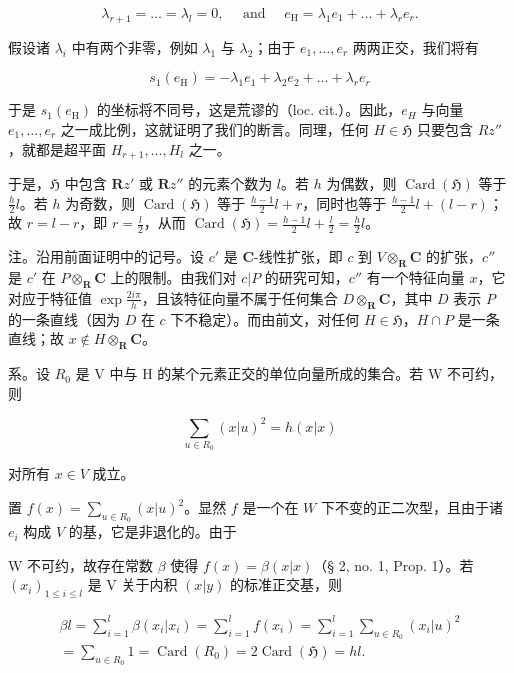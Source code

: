 \[
\lambda_ {r + 1} = \dots = \lambda_ {l} = 0, \quad \text { and } \quad e _ {\mathrm{H}} = \lambda_ {1} e _ {1} + \dots + \lambda_ {r} e _ {r}.
\]

假设诸 \(\lambda_{i}\) 中有两个非零，例如 \(\lambda_{1}\) 与 \(\lambda_{2}\)；由于 \(e_{1},\ldots,e_{r}\) 两两正交，我们将有

\[
s _ {1} (e _ {\mathrm{H}}) = - \lambda_ {1} e _ {1} + \lambda_ {2} e _ {2} + \dots + \lambda_ {r} e _ {r}
\]

于是 \(s_{1}(e_{\mathrm{H}})\) 的坐标将不同号，这是荒谬的（loc. cit.）。因此，\(e_{H}\) 与向量 \(e_{1},\ldots,e_{r}\) 之一成比例，这就证明了我们的断言。同理，任何 \(H\in \mathfrak{H}\) 只要包含 \(Rz''\)，就都是超平面 \(H_{r+1},\ldots,H_{l}\) 之一。

于是，\(\mathfrak{H}\) 中包含 \(\mathbf{R}z'\) 或 \(\mathbf{R}z''\) 的元素个数为 \(l\)。若 \(h\) 为偶数，则 \(\operatorname{Card}(\mathfrak{H})\) 等于 \(\frac{h}{2} l\)。若 \(h\) 为奇数，则 \(\operatorname{Card}(\mathfrak{H})\) 等于 \(\frac{h - 1}{2} l + r\)，同时也等于 \(\frac{h - 1}{2} l + (l - r)\)；故 \(r = l - r\)，即 \(r = \frac{l}{2}\)，从而 \(\operatorname{Card}(\mathfrak{H}) = \frac{h - 1}{2} l + \frac{l}{2} = \frac{h}{2} l\)。

注。沿用前面证明中的记号。设 \(c'\) 是 \(\mathbf{C}\)-线性扩张，即 \(c\) 到 \(V \otimes_{\mathbf{R}} \mathbf{C}\) 的扩张，\(c''\) 是 \(c'\) 在 \(P \otimes_{\mathbf{R}} \mathbf{C}\) 上的限制。由我们对 \(c|P\) 的研究可知，\(c''\) 有一个特征向量 \(x\)，它对应于特征值 \(\exp \frac{2i\pi}{h}\)，且该特征向量不属于任何集合 \(D \otimes_{\mathbf{R}} \mathbf{C}\)，其中 \(D\) 表示 \(P\) 的一条直线（因为 \(D\) 在 \(c\) 下不稳定）。而由前文，对任何 \(H \in \mathfrak{H}\)，\(H \cap P\) 是一条直线；故 \(x \notin H \otimes_{\mathbf{R}} \mathbf{C}\)。

系。设 \(R_{0}\) 是 V 中与 H 的某个元素正交的单位向量所成的集合。若 W 不可约，则

\[
\sum_ {u \in R _ {0}} (x | u) ^ {2} = h (x | x)\tag{4}
\]

对所有 \(x \in V\) 成立。

置 \(f(x) = \sum_{u \in R_0} (x|u)^2\)。显然 \(f\) 是一个在 \(W\) 下不变的正二次型，且由于诸 \(e_i\) 构成 \(V\) 的基，它是非退化的。由于

W 不可约，故存在常数 \(\beta\) 使得 \(f(x) = \beta (x|x)\)（§ 2, no. 1, Prop. 1）。若 \((x_{i})_{1\leqslant i\leqslant l}\) 是 V 关于内积 \((x|y)\) 的标准正交基，则

\[
\begin{array}{l} \beta l = \sum_ {i = 1} ^ {l} \beta (x _ {i} | x _ {i}) = \sum_ {i = 1} ^ {l} f (x _ {i}) = \sum_ {i = 1} ^ {l} \sum_ {u \in R _ {0}} (x _ {i} | u) ^ {2} \\ = \sum_ {u \in R _ {0}} 1 = \operatorname{Card} (R _ {0}) = 2 \operatorname{Card} (\mathfrak {H}) = h l. \end{array}
\]

